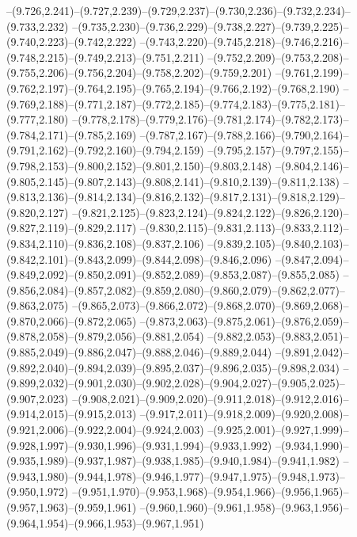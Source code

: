   --(9.726,2.241)--(9.727,2.239)--(9.729,2.237)--(9.730,2.236)--(9.732,2.234)--(9.733,2.232)%
  --(9.735,2.230)--(9.736,2.229)--(9.738,2.227)--(9.739,2.225)--(9.740,2.223)--(9.742,2.222)%
  --(9.743,2.220)--(9.745,2.218)--(9.746,2.216)--(9.748,2.215)--(9.749,2.213)--(9.751,2.211)%
  --(9.752,2.209)--(9.753,2.208)--(9.755,2.206)--(9.756,2.204)--(9.758,2.202)--(9.759,2.201)%
  --(9.761,2.199)--(9.762,2.197)--(9.764,2.195)--(9.765,2.194)--(9.766,2.192)--(9.768,2.190)%
  --(9.769,2.188)--(9.771,2.187)--(9.772,2.185)--(9.774,2.183)--(9.775,2.181)--(9.777,2.180)%
  --(9.778,2.178)--(9.779,2.176)--(9.781,2.174)--(9.782,2.173)--(9.784,2.171)--(9.785,2.169)%
  --(9.787,2.167)--(9.788,2.166)--(9.790,2.164)--(9.791,2.162)--(9.792,2.160)--(9.794,2.159)%
  --(9.795,2.157)--(9.797,2.155)--(9.798,2.153)--(9.800,2.152)--(9.801,2.150)--(9.803,2.148)%
  --(9.804,2.146)--(9.805,2.145)--(9.807,2.143)--(9.808,2.141)--(9.810,2.139)--(9.811,2.138)%
  --(9.813,2.136)--(9.814,2.134)--(9.816,2.132)--(9.817,2.131)--(9.818,2.129)--(9.820,2.127)%
  --(9.821,2.125)--(9.823,2.124)--(9.824,2.122)--(9.826,2.120)--(9.827,2.119)--(9.829,2.117)%
  --(9.830,2.115)--(9.831,2.113)--(9.833,2.112)--(9.834,2.110)--(9.836,2.108)--(9.837,2.106)%
  --(9.839,2.105)--(9.840,2.103)--(9.842,2.101)--(9.843,2.099)--(9.844,2.098)--(9.846,2.096)%
  --(9.847,2.094)--(9.849,2.092)--(9.850,2.091)--(9.852,2.089)--(9.853,2.087)--(9.855,2.085)%
  --(9.856,2.084)--(9.857,2.082)--(9.859,2.080)--(9.860,2.079)--(9.862,2.077)--(9.863,2.075)%
  --(9.865,2.073)--(9.866,2.072)--(9.868,2.070)--(9.869,2.068)--(9.870,2.066)--(9.872,2.065)%
  --(9.873,2.063)--(9.875,2.061)--(9.876,2.059)--(9.878,2.058)--(9.879,2.056)--(9.881,2.054)%
  --(9.882,2.053)--(9.883,2.051)--(9.885,2.049)--(9.886,2.047)--(9.888,2.046)--(9.889,2.044)%
  --(9.891,2.042)--(9.892,2.040)--(9.894,2.039)--(9.895,2.037)--(9.896,2.035)--(9.898,2.034)%
  --(9.899,2.032)--(9.901,2.030)--(9.902,2.028)--(9.904,2.027)--(9.905,2.025)--(9.907,2.023)%
  --(9.908,2.021)--(9.909,2.020)--(9.911,2.018)--(9.912,2.016)--(9.914,2.015)--(9.915,2.013)%
  --(9.917,2.011)--(9.918,2.009)--(9.920,2.008)--(9.921,2.006)--(9.922,2.004)--(9.924,2.003)%
  --(9.925,2.001)--(9.927,1.999)--(9.928,1.997)--(9.930,1.996)--(9.931,1.994)--(9.933,1.992)%
  --(9.934,1.990)--(9.935,1.989)--(9.937,1.987)--(9.938,1.985)--(9.940,1.984)--(9.941,1.982)%
  --(9.943,1.980)--(9.944,1.978)--(9.946,1.977)--(9.947,1.975)--(9.948,1.973)--(9.950,1.972)%
  --(9.951,1.970)--(9.953,1.968)--(9.954,1.966)--(9.956,1.965)--(9.957,1.963)--(9.959,1.961)%
  --(9.960,1.960)--(9.961,1.958)--(9.963,1.956)--(9.964,1.954)--(9.966,1.953)--(9.967,1.951)%
